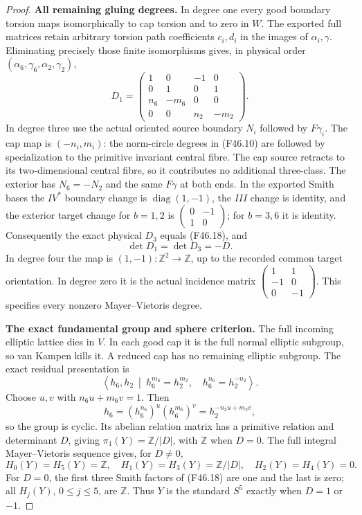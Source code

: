 \begin{proof}
\par\medskip\noindent\textbf{All remaining gluing degrees.}
In degree one every good boundary torsion maps isomorphically
to cap torsion and to zero in $W$. The exported full matrices
retain arbitrary torsion path coefficients $c_i,d_i$ in the
images of $\alpha_i,\gamma$. Eliminating precisely those finite
isomorphisms gives, in physical order
$(\alpha_6,\gamma_6,\alpha_2,\gamma_2)$,
\[
 D_1=\begin{pmatrix}
1&0&-1&0\\0&1&0&1\\n_6&-m_6&0&0\\0&0&n_2&-m_2
\end{pmatrix}.                                                  \tag{F46.18}
\]
In degree three use the actual oriented source boundary $N_i$
followed by $F\gamma_i$. The cap map is $(-n_i,m_i)$:
the norm-circle degrees in (F46.10) are followed by specialization
to the primitive invariant central fibre. The cap source
retracts to its two-dimensional central fibre, so it contributes
no additional three-class. The exterior has $N_6=-N_2$ and
the same $F\gamma$ at both ends. In the exported Smith bases
the $IV^*$ boundary change is $\operatorname{diag}(1,-1)$,
the $III$ change is identity, and the exterior target change
for $b=1,2$ is $\left(\begin{smallmatrix}0&-1\\1&0\end{smallmatrix}\right)$;
for $b=3,6$ it is identity. Consequently the exact physical
$D_3$ equals (F46.18), and
\[
                   \det D_1=\det D_3=-D.                        \tag{F46.19}
\]
In degree four the map is $(1,-1):\mathbb Z^2\to\mathbb Z$,
up to the recorded common target orientation. In degree zero
it is the actual incidence matrix
$\left(\begin{smallmatrix}1&1\\-1&0\\0&-1\end{smallmatrix}\right)$.
This specifies every nonzero Mayer--Vietoris degree.

\par\medskip\noindent\textbf{The exact fundamental group and sphere criterion.}
The full incoming elliptic lattice dies in $V$. In each good
cap it is the full normal elliptic subgroup, so van Kampen
kills it. A reduced cap has no remaining elliptic subgroup.
The exact residual presentation is
\[
 \left\langle h_6,h_2\ \middle|\
 h_6^{m_6}=h_2^{m_2},\quad h_6^{n_6}=h_2^{-n_2}\right\rangle.
\]
Choose $u,v$ with $n_6u+m_6v=1$. Then
\[
 h_6=(h_6^{n_6})^u(h_6^{m_6})^v
       =h_2^{-n_2u+m_2v},
\]
so the group is cyclic. Its abelian relation matrix has a
primitive relation and determinant $D$, giving
$\pi_1(Y)=\mathbb Z/|D|$, with $\mathbb Z$ when $D=0$.
The full integral Mayer--Vietoris sequence gives, for $D\ne0$,
\[
 H_0(Y)=H_5(Y)=\mathbb Z,\quad
 H_1(Y)=H_3(Y)=\mathbb Z/|D|,\quad H_2(Y)=H_4(Y)=0.             \tag{F46.20}
\]
For $D=0$, the first three Smith factors of (F46.18) are one
and the last is zero; all $H_j(Y)$, $0\le j\le5$, are
$\mathbb Z$. Thus $Y$ is the standard $S^5$ exactly when
$D=1$ or $-1$.


\end{proof}
